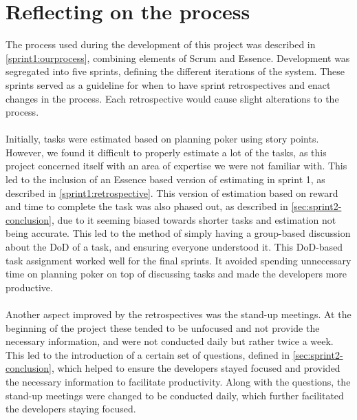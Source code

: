 \section{Reflecting on the process}
The process used during the development of this project was described in \autoref{sprint1:ourprocess}, combining elements of Scrum and Essence.
Development was segregated into five sprints, defining the different iterations of the system.
These sprints served as a guideline for when to have sprint retrospectives and enact changes in the process.
Each retrospective would cause slight alterations to the process.
\\\\
Initially, tasks were estimated based on planning poker using story points.
However, we found it difficult to properly estimate a lot of the tasks, as this project concerned itself with an area of expertise we were not familiar with.
This led to the inclusion of an Essence based version of estimating in sprint 1, as described in \autoref{sprint1:retrospective}.
This version of estimation based on reward and time to complete the task was also phased out, as described in \autoref{sec:sprint2-conclusion}, due to it seeming biased towards shorter tasks and estimation not being accurate.
This led to the method of simply having a group-based discussion about the DoD of a task, and ensuring everyone understood it.
This DoD-based task assignment worked well for the final sprints.
It avoided spending unnecessary time on planning poker on top of discussing tasks and made the developers more productive.
\\\\
Another aspect improved by the retrospectives was the stand-up meetings.
At the beginning of the project these tended to be unfocused and not provide the necessary information, and were not conducted daily but rather twice a week.
This led to the introduction of a certain set of questions, defined in \autoref{sec:sprint2-conclusion}, which helped to ensure the developers stayed focused and provided the necessary information to facilitate productivity.
Along with the questions, the stand-up meetings were changed to be conducted daily, which further facilitated the developers staying focused.
\\\\
